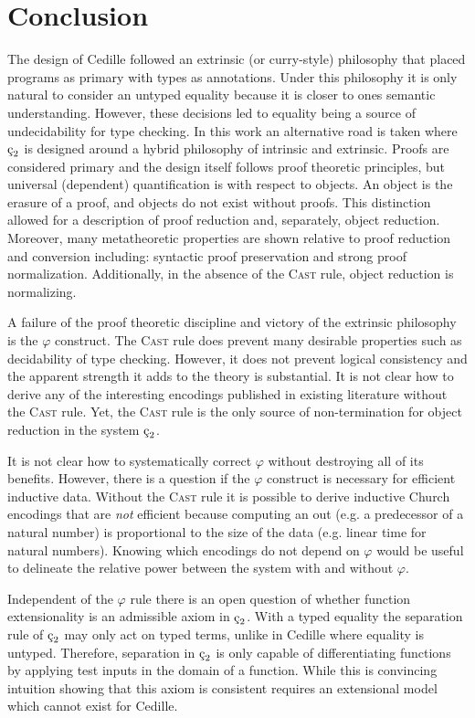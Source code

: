 \chapter{Conclusion}

The design of Cedille followed an extrinsic (or curry-style) philosophy that placed programs as primary with types as annotations.
Under this philosophy it is only natural to consider an untyped equality because it is closer to ones semantic understanding.
However, these decisions led to equality being a source of undecidability for type checking.
In this work an alternative road is taken where $\ced$ is designed around a hybrid philosophy of intrinsic and extrinsic.
Proofs are considered primary and the design itself follows proof theoretic principles, but universal (dependent) quantification is with respect to objects.
An object is the erasure of a proof, and objects do not exist without proofs.
This distinction allowed for a description of proof reduction and, separately, object reduction.
Moreover, many metatheoretic properties are shown relative to proof reduction and conversion including: syntactic proof preservation and strong proof normalization.
Additionally, in the absence of the \textsc{Cast} rule, object reduction is normalizing.

A failure of the proof theoretic discipline and victory of the extrinsic philosophy is the $\varphi$ construct.
The \textsc{Cast} rule does prevent many desirable properties such as decidability of type checking.
However, it does not prevent logical consistency and the apparent strength it adds to the theory is substantial.
It is not clear how to derive any of the interesting encodings published in existing literature without the \textsc{Cast} rule.
Yet, the \textsc{Cast} rule is the only source of non-termination for object reduction in the system $\ced$.

It is not clear how to systematically correct $\varphi$ without destroying all of its benefits.
However, there is a question if the $\varphi$ construct is necessary for efficient inductive data.
Without the \textsc{Cast} rule it is possible to derive inductive Church encodings that are \textit{not} efficient because computing an out (e.g. a predecessor of a natural number) is proportional to the size of the data (e.g. linear time for natural numbers).
Knowing which encodings do not depend on $\varphi$ would be useful to delineate the relative power between the system with and without $\varphi$.

Independent of the $\varphi$ rule there is an open question of whether function extensionality is an admissible axiom in $\ced$.
With a typed equality the separation rule of $\ced$ may only act on typed terms, unlike in Cedille where equality is untyped.
Therefore, separation in $\ced$ is only capable of differentiating functions by applying test inputs in the domain of a function.
While this is convincing intuition showing that this axiom is consistent requires an extensional model which cannot exist for Cedille.


